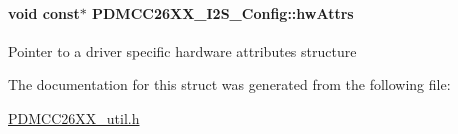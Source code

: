 \paragraph[{hw\+Attrs}]{\setlength{\rightskip}{0pt plus 5cm}void const$\ast$ P\+D\+M\+C\+C26\+X\+X\+\_\+\+I2\+S\+\_\+\+Config\+::hw\+Attrs}\label{struct_p_d_m_c_c26_x_x___i2_s___config_a45d9141418dd765f894371694b878819}
Pointer to a driver specific hardware attributes structure 

The documentation for this struct was generated from the following file\+:\begin{DoxyCompactItemize}
\item 
\hyperlink{_p_d_m_c_c26_x_x__util_8h}{P\+D\+M\+C\+C26\+X\+X\+\_\+util.\+h}\end{DoxyCompactItemize}
